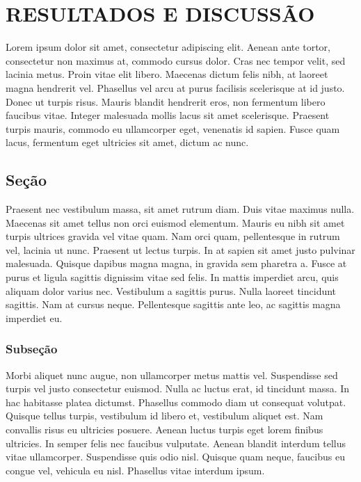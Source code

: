 \chapter{RESULTADOS E DISCUSSÃO}


Lorem ipsum dolor sit amet, consectetur adipiscing elit. Aenean ante tortor, consectetur non maximus at, commodo cursus dolor. Cras nec tempor velit, sed lacinia metus. Proin vitae elit libero. Maecenas dictum felis nibh, at laoreet magna hendrerit vel. Phasellus vel arcu at purus facilisis scelerisque at id justo. Donec ut turpis risus. Mauris blandit hendrerit eros, non fermentum libero faucibus vitae. Integer malesuada mollis lacus sit amet scelerisque. Praesent turpis mauris, commodo eu ullamcorper eget, venenatis id sapien. Fusce quam lacus, fermentum eget ultricies sit amet, dictum ac nunc.

\section{Seção}

Praesent nec vestibulum massa, sit amet rutrum diam. Duis vitae maximus nulla. Maecenas sit amet tellus non orci euismod elementum. Mauris eu nibh sit amet turpis ultrices gravida vel vitae quam. Nam orci quam, pellentesque in rutrum vel, lacinia ut nunc. Praesent ut lectus turpis. In at sapien sit amet justo pulvinar malesuada. Quisque dapibus magna magna, in gravida sem pharetra a. Fusce at purus et ligula sagittis dignissim vitae sed felis. In mattis imperdiet arcu, quis aliquam dolor varius nec. Vestibulum a sagittis purus. Nulla laoreet tincidunt sagittis. Nam at cursus neque. Pellentesque sagittis ante leo, ac sagittis magna imperdiet eu.

\subsection{Subseção}

Morbi aliquet nunc augue, non ullamcorper metus mattis vel. Suspendisse sed turpis vel justo consectetur euismod. Nulla ac luctus erat, id tincidunt massa. In hac habitasse platea dictumst. Phasellus commodo diam ut consequat volutpat. Quisque tellus turpis, vestibulum id libero et, vestibulum aliquet est. Nam convallis risus eu ultricies posuere. Aenean luctus turpis eget lorem finibus ultricies. In semper felis nec faucibus vulputate. Aenean blandit interdum tellus vitae ullamcorper. Suspendisse quis odio nisl. Quisque quam neque, faucibus eu congue vel, vehicula eu nisl. Phasellus vitae interdum ipsum.